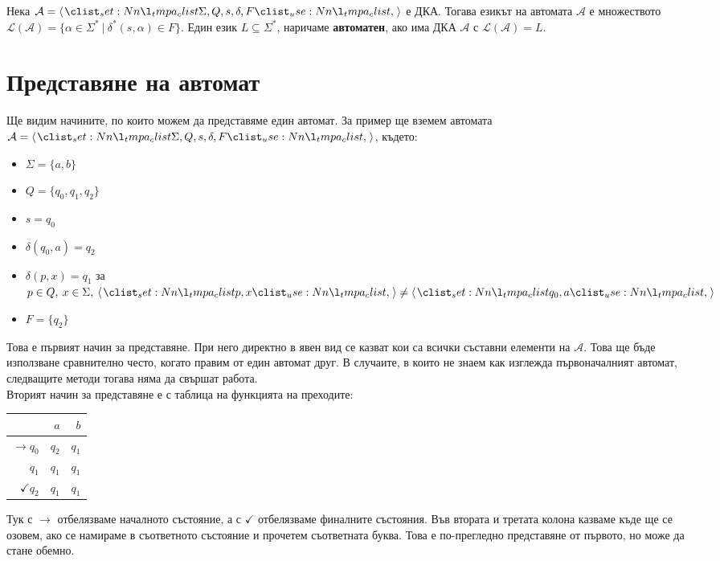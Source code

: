 \begin{definition}
    Нека $\mathcal{A} = \opair{\Sigma, Q, s, \delta, F}$ е ДКА.
    Тогава езикът на автомата $\mathcal{A}$ е множеството
    $\mathcal{L}(\mathcal{A}) = \{ \alpha \in \Sigma^* \: | \: \delta^*(s, \alpha) \in F \}$.
    Един език $L \subseteq \Sigma^*$, наричаме \textbf{автоматен}, ако има ДКА $\mathcal{A}$ с $\mathcal{L}(\mathcal{A}) = L$.
\end{definition}

\section{Представяне на автомат}

Ще видим начините, по които можем да представяме един автомат.
За пример ще вземем автомата $\mathcal{A} = \opair{\Sigma, Q, s, \delta, F}$, където:
\begin{itemize}
    \item $\Sigma = \{ a, b \}$
    \item $Q = \{ q_0, q_1, q_2 \}$
    \item $s = q_0$
    \item $\delta(q_0, a) = q_2$
    \item $\delta(p, x) = q_1$ за $p \in Q, \: x \in \Sigma, \: \opair{p, x} \neq \opair{q_0, a}$
    \item $F = \{ q_2 \}$
\end{itemize}
Това е първият начин за представяне.
При него директно в явен вид се казват кои са всички съставни елементи на $\mathcal{A}$.
Това ще бъде използване сравнително често, когато правим от един автомат друг.
В случаите, в които не знаем как изглежда първоначалният автомат, следващите методи тогава няма да свършат работа. \\

Вторият начин за представяне е с таблица на функцията на преходите:
\begin{center}
    \begin{tabular}{||r | r | r||}
        \hline
        \cellcolor{lightgray} & $a$   & $b$   \\
        \hline
        $\rightarrow q_0$     & $q_2$ & $q_1$ \\
        \hline
        $q_1$                 & $q_1$ & $q_1$ \\
        \hline
        $\checkmark q_2$      & $q_1$ & $q_1$ \\
        \hline
    \end{tabular}
\end{center}
Тук с $\rightarrow$ отбелязваме началното състояние,
а с $\checkmark$ отбелязваме финалните състояния.
Във втората и третата колона казваме къде ще се озовем,
ако се намираме в съответното състояние и прочетем съответната буква.
Това е по-прегледно представяне от първото, но може да стане обемно. \\

